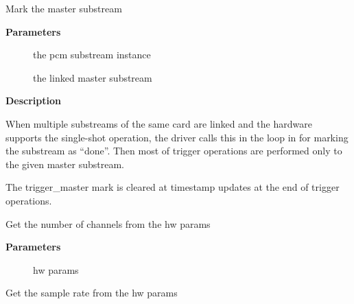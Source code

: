 \documentclass[a4paper,8pt,english]{sphinxmanual}
\begin{document}
\begin{fulllineitems}
\label{sound/kernel-api/alsa-driver-api:c.snd_pcm_trigger_done}
Mark the master substream

\end{fulllineitems}


\textbf{Parameters}
\begin{description}
\item[{}] \leavevmode
the pcm substream instance

\item[{}] \leavevmode
the linked master substream

\end{description}

\textbf{Description}

When multiple substreams of the same card are linked and the hardware
supports the single-shot operation, the driver calls this in the loop
in  for marking the substream as ``done''.
Then most of trigger operations are performed only to the given master
substream.

The trigger\_master mark is cleared at timestamp updates at the end
of trigger operations.

\begin{fulllineitems}
\label{sound/kernel-api/alsa-driver-api:c.params_channels}
Get the number of channels from the hw params

\end{fulllineitems}


\textbf{Parameters}
\begin{description}
\item[{}] \leavevmode
hw params

\end{description}

\begin{fulllineitems}
\label{sound/kernel-api/alsa-driver-api:c.params_rate}
Get the sample rate from the hw params

\end{fulllineitems}
\end{document}
